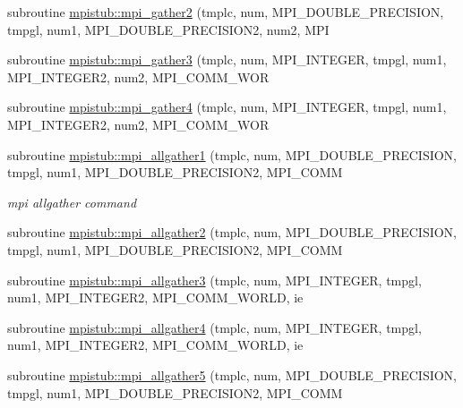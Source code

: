\begin{DoxyCompactItemize}
subroutine \mbox{\hyperlink{namespacempistub_a9be56b07b004daadf8c9baeb3f79a9eb}{mpistub\+::mpi\+\_\+gather2}} (tmplc, num, M\+P\+I\+\_\+\+D\+O\+U\+B\+L\+E\+\_\+\+P\+R\+E\+C\+I\+S\+I\+ON, tmpgl, num1, M\+P\+I\+\_\+\+D\+O\+U\+B\+L\+E\+\_\+\+P\+R\+E\+C\+I\+S\+I\+O\+N2, num2, M\+PI
\item 
subroutine \mbox{\hyperlink{namespacempistub_a4a5262ac6eca022843c0cd39b508e35f}{mpistub\+::mpi\+\_\+gather3}} (tmplc, num, M\+P\+I\+\_\+\+I\+N\+T\+E\+G\+ER, tmpgl, num1, M\+P\+I\+\_\+\+I\+N\+T\+E\+G\+E\+R2, num2, M\+P\+I\+\_\+\+C\+O\+M\+M\+\_\+\+W\+OR
\item 
subroutine \mbox{\hyperlink{namespacempistub_a6c7b2f5337f97885b72a76ec35729075}{mpistub\+::mpi\+\_\+gather4}} (tmplc, num, M\+P\+I\+\_\+\+I\+N\+T\+E\+G\+ER, tmpgl, num1, M\+P\+I\+\_\+\+I\+N\+T\+E\+G\+E\+R2, num2, M\+P\+I\+\_\+\+C\+O\+M\+M\+\_\+\+W\+OR
\item 
subroutine \mbox{\hyperlink{namespacempistub_a61c97c834a766b0372d758a4158ae7da}{mpistub\+::mpi\+\_\+allgather1}} (tmplc, num, M\+P\+I\+\_\+\+D\+O\+U\+B\+L\+E\+\_\+\+P\+R\+E\+C\+I\+S\+I\+ON, tmpgl, num1, M\+P\+I\+\_\+\+D\+O\+U\+B\+L\+E\+\_\+\+P\+R\+E\+C\+I\+S\+I\+O\+N2, M\+P\+I\+\_\+\+C\+O\+MM
\begin{DoxyCompactList}\small\item\em mpi allgather command \end{DoxyCompactList}\item 
subroutine \mbox{\hyperlink{namespacempistub_a4af9ae68605228fa295ff15192cad31c}{mpistub\+::mpi\+\_\+allgather2}} (tmplc, num, M\+P\+I\+\_\+\+D\+O\+U\+B\+L\+E\+\_\+\+P\+R\+E\+C\+I\+S\+I\+ON, tmpgl, num1, M\+P\+I\+\_\+\+D\+O\+U\+B\+L\+E\+\_\+\+P\+R\+E\+C\+I\+S\+I\+O\+N2, M\+P\+I\+\_\+\+C\+O\+MM
\item 
subroutine \mbox{\hyperlink{namespacempistub_a60f773685d2ab6f25d3d674acd53d941}{mpistub\+::mpi\+\_\+allgather3}} (tmplc, num, M\+P\+I\+\_\+\+I\+N\+T\+E\+G\+ER, tmpgl, num1, M\+P\+I\+\_\+\+I\+N\+T\+E\+G\+E\+R2, M\+P\+I\+\_\+\+C\+O\+M\+M\+\_\+\+W\+O\+R\+LD, ie
\item 
subroutine \mbox{\hyperlink{namespacempistub_a2b8f9c4bef9676116ba1eeb6b4e72af5}{mpistub\+::mpi\+\_\+allgather4}} (tmplc, num, M\+P\+I\+\_\+\+I\+N\+T\+E\+G\+ER, tmpgl, num1, M\+P\+I\+\_\+\+I\+N\+T\+E\+G\+E\+R2, M\+P\+I\+\_\+\+C\+O\+M\+M\+\_\+\+W\+O\+R\+LD, ie
\item 
subroutine \mbox{\hyperlink{namespacempistub_afa6d7737a2157021051c7c4e7c159079}{mpistub\+::mpi\+\_\+allgather5}} (tmplc, num, M\+P\+I\+\_\+\+D\+O\+U\+B\+L\+E\+\_\+\+P\+R\+E\+C\+I\+S\+I\+ON, tmpgl, num1, M\+P\+I\+\_\+\+D\+O\+U\+B\+L\+E\+\_\+\+P\+R\+E\+C\+I\+S\+I\+O\+N2, M\+P\+I\+\_\+\+C\+O\+MM

\end{DoxyCompactItemize}
